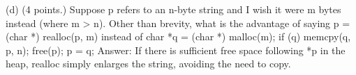 (d) (4 points.) Suppose p refers to an n-byte string and I wish it were m bytes instead 
(where m > n). Other than brevity, what is the advantage of saying 
p = (char *) realloc(p, m) instead of 
{ char *q = (char *) malloc(m); 
if (q) { 
memcpy(q, p, n); 
free(p); 
} 
p = q; 
} 
Answer: If there is suﬃcient free space following *p in the heap, realloc simply 
enlarges the string, avoiding the need to copy. 
